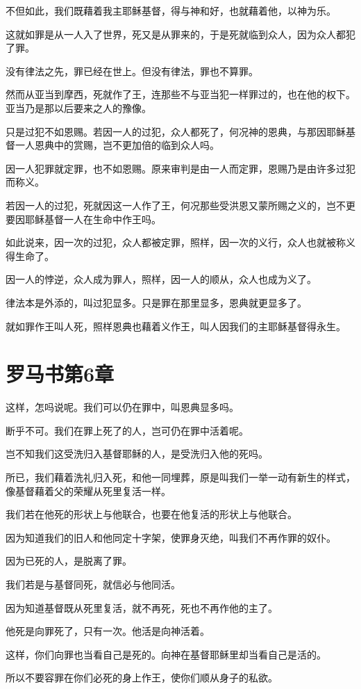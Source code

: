 \documentclass[12pt,oneside]{book}
\begin{document}
不但如此，我们既藉着我主耶稣基督，得与神和好，也就藉着他，以神为乐。

这就如罪是从一人入了世界，死又是从罪来的，于是死就临到众人，因为众人都犯了罪。

没有律法之先，罪已经在世上。但没有律法，罪也不算罪。

然而从亚当到摩西，死就作了王，连那些不与亚当犯一样罪过的，也在他的权下。亚当乃是那以后要来之人的豫像。

只是过犯不如恩赐。若因一人的过犯，众人都死了，何况神的恩典，与那因耶稣基督一人恩典中的赏赐，岂不更加倍的临到众人吗。

因一人犯罪就定罪，也不如恩赐。原来审判是由一人而定罪，恩赐乃是由许多过犯而称义。

若因一人的过犯，死就因这一人作了王，何况那些受洪恩又蒙所赐之义的，岂不更要因耶稣基督一人在生命中作王吗。

如此说来，因一次的过犯，众人都被定罪，照样，因一次的义行，众人也就被称义得生命了。

因一人的悖逆，众人成为罪人，照样，因一人的顺从，众人也成为义了。

律法本是外添的，叫过犯显多。只是罪在那里显多，恩典就更显多了。

就如罪作王叫人死，照样恩典也藉着义作王，叫人因我们的主耶稣基督得永生。

\chapter{罗马书第6章}
这样，怎吗说呢。我们可以仍在罪中，叫恩典显多吗。

断乎不可。我们在罪上死了的人，岂可仍在罪中活着呢。

岂不知我们这受洗归入基督耶稣的人，是受洗归入他的死吗。

所已，我们藉着洗礼归入死，和他一同埋葬，原是叫我们一举一动有新生的样式，像基督藉着父的荣耀从死里复活一样。

我们若在他死的形状上与他联合，也要在他复活的形状上与他联合。

因为知道我们的旧人和他同定十字架，使罪身灭绝，叫我们不再作罪的奴仆。

因为已死的人，是脱离了罪。

我们若是与基督同死，就信必与他同活。

因为知道基督既从死里复活，就不再死，死也不再作他的主了。

他死是向罪死了，只有一次。他活是向神活着。

这样，你们向罪也当看自己是死的。向神在基督耶稣里却当看自己是活的。

所以不要容罪在你们必死的身上作王，使你们顺从身子的私欲。
\end{document}
